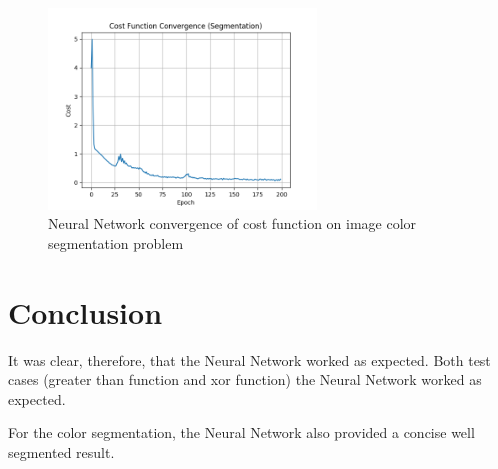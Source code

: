 \documentclass[journal]{IEEEtran}
\begin{document}
\begin{figure}
  \begin{center}
  \includegraphics[width=2.8in]{./../code/result/cost_function_convergence_segmentation.png}
  \caption{Neural Network convergence of cost function on image color segmentation problem}
  \label{img:result_convergence}
  \end{center}
\end{figure}

\section {Conclusion}

It was clear, therefore, that the Neural Network worked as expected. Both test cases (greater than function and xor function) the Neural Network worked as expected.

For the color segmentation, the Neural Network also provided a concise well segmented result.

\vfill
\end{document}
